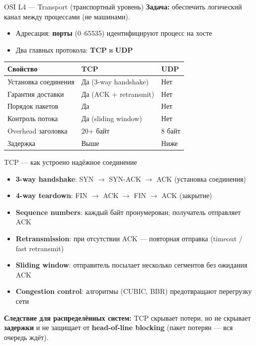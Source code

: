 \documentclass{beamer}
\begin{document}
\begin{frame}{OSI L4 --- Transport (транспортный уровень)}
\textbf{Задача:} обеспечить логический канал между процессами (не машинами).
\begin{itemize}
  \item Адресация: \textbf{порты} (0--65535) идентифицируют процесс на хосте
  \item Два главных протокола: \textbf{TCP} и \textbf{UDP}
\end{itemize}
\vspace{0.3cm}
\begin{center}
\begin{tabular}{lll}
\textbf{Свойство}       & \textbf{TCP}                       & \textbf{UDP}              \\ \hline
Установка соединения    & Да (3-way handshake)               & Нет                       \\
Гарантия доставки       & Да (ACK + retransmit)              & Нет                       \\
Порядок пакетов         & Да                                 & Нет                       \\
Контроль потока         & Да (sliding window)                & Нет                       \\
Overhead заголовка      & 20+ байт                           & 8 байт                    \\
Задержка                & Выше                               & Ниже                      \\
\end{tabular}
\end{center}
\end{frame}

\begin{frame}{TCP --- как устроено надёжное соединение}
\begin{itemize}
  \item \textbf{3-way handshake}: SYN $\to$ SYN-ACK $\to$ ACK (установка соединения)
  \item \textbf{4-way teardown}: FIN $\to$ ACK $\to$ FIN $\to$ ACK (закрытие)
  \item \textbf{Sequence numbers}: каждый байт пронумерован; получатель отправляет ACK
  \item \textbf{Retransmission}: при отсутствии ACK --- повторная отправка (timeout / fast retransmit)
  \item \textbf{Sliding window}: отправитель посылает несколько сегментов без ожидания ACK
  \item \textbf{Congestion control}: алгоритмы (CUBIC, BBR) предотвращают перегрузку сети
\end{itemize}
\vspace{0.3cm}
\textbf{Следствие для распределённых систем:} TCP скрывает потери, но не скрывает \textbf{задержки} и не защищает от \textbf{head-of-line blocking} (пакет потерян --- вся очередь ждёт).
\end{frame}
\end{document}
